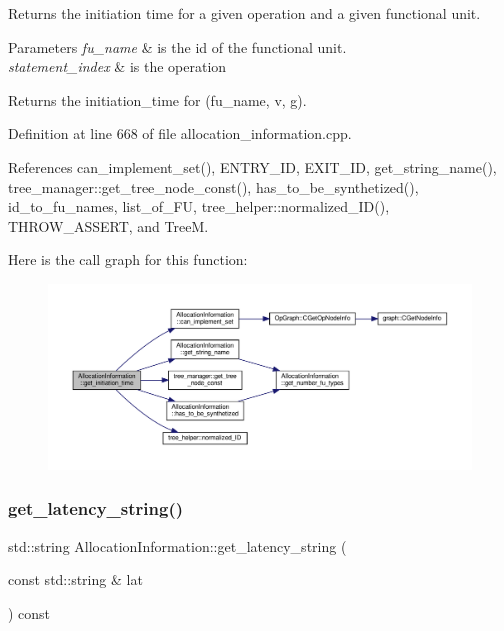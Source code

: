Returns the initiation time for a given operation and a given functional unit. 


\begin{DoxyParams}{Parameters}
{\em fu\+\_\+name} & is the id of the functional unit. \\
\hline
{\em statement\+\_\+index} & is the operation \\
\hline
\end{DoxyParams}
\begin{DoxyReturn}{Returns}
the initiation\+\_\+time for (fu\+\_\+name, v, g). 
\end{DoxyReturn}


Definition at line 668 of file allocation\+\_\+information.\+cpp.



References can\+\_\+implement\+\_\+set(), E\+N\+T\+R\+Y\+\_\+\+ID, E\+X\+I\+T\+\_\+\+ID, get\+\_\+string\+\_\+name(), tree\+\_\+manager\+::get\+\_\+tree\+\_\+node\+\_\+const(), has\+\_\+to\+\_\+be\+\_\+synthetized(), id\+\_\+to\+\_\+fu\+\_\+names, list\+\_\+of\+\_\+\+FU, tree\+\_\+helper\+::normalized\+\_\+\+I\+D(), T\+H\+R\+O\+W\+\_\+\+A\+S\+S\+E\+RT, and TreeM.

Here is the call graph for this function\+:
\nopagebreak
\begin{figure}[H]
\begin{center}
\leavevmode
\includegraphics[width=350pt]{d7/d79/classAllocationInformation_acb8b91c250bba52b3f9ece7e9ff20a6e_cgraph}
\end{center}
\end{figure}
\mbox{\label{classAllocationInformation_a0fcc083348815a0f1e64767c4ce3aa89}} 
\subsubsection{\texorpdfstring{get\+\_\+latency\+\_\+string()}{get\_latency\_string()}}
{\footnotesize\ttfamily std\+::string Allocation\+Information\+::get\+\_\+latency\+\_\+string (\begin{DoxyParamCaption}\item[{const std\+::string \&}]{lat }\end{DoxyParamCaption}) const\hspace{0.3cm}{\ttfamily [private]}}



